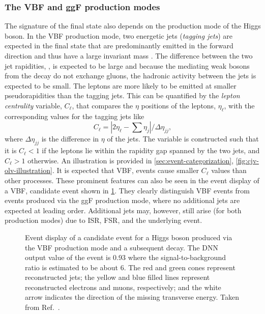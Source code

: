 \subsubsection{The VBF and ggF production modes}
The signature of the final state also depends on the production mode of the Higgs boson.
In the VBF production mode, two energetic jets (\emph{tagging jets}) are expected in the final state that are predominantly emitted in the forward direction and thus have a large invariant mass \mjj. 
The difference between the two jet rapidities, \dyjj, is expected to be large and because the mediating weak bosons from the \HWW decay do not exchange gluons, the hadronic activity between the jets is expected to be small. 
The leptons are more likely to be emitted at smaller pseudorapidities than the tagging jets. This can be quantified by the \emph{lepton centrality} variable, $C_\ell$, that compares the $\eta$ positions of the leptons, $\eta_\ell$, with the corresponding values for the tagging jets like
\begin{equation}
    C_\ell = |2\eta_\ell - \sum \eta_j| / \Delta \eta_{jj},
\end{equation}
where $\Delta \eta_{jj}$ is the difference in $\eta$ of the jets. 
The variable is constructed such that it is $C_\ell < 1$ if the leptons lie within the rapidity gap spanned by the two jets, and $C_\ell > 1$ otherwise. An illustration is provided in \cref{sec:event-categorization}, \cref{fig:cjv-olv-illustration}. 
It is expected that VBF, \HWW events cause smaller $C_\ell$ values than other processes.
These prominent features can also be seen in the event display of a VBF, \HWW candidate event shown in \cref{fig:vbf-event-display}. 
They clearly distinguish VBF events from events produced via the ggF production mode, where no additional jets are expected at leading order. 
Additional jets may, however, still arise (for both production modes) due to ISR, FSR, and the underlying event. 

\begin{figure}
    {}
    {}
    \caption[Event display of a candidate event for a Higgs boson produced via the VBF production mode and a subsequent \HWWdet decay.]{Event display of a candidate event for a Higgs boson produced via the VBF production mode and a subsequent \HWWdet decay. The DNN output value of the event is 0.93 where the signal-to-background ratio is estimated to be about 6. 
    The red and green cones represent reconstructed jets; the yellow and blue filled lines represent reconstructed electrons and muons, respectively; and the white arrow indicates the direction of the missing transverse energy. 
    Taken from Ref.~\cite{HWWPaper}.}
    \label{fig:vbf-event-display}
\end{figure}

